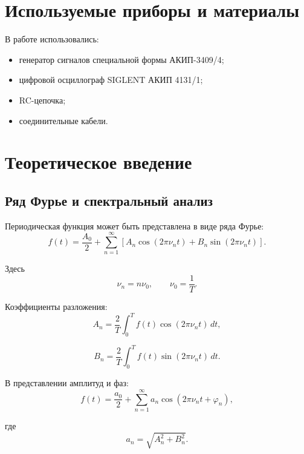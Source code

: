 \documentclass[14pt,a4paper]{extarticle}
\begin{document}
\section*{Используемые приборы и материалы}

В работе использовались:
\begin{itemize}
    \item генератор сигналов специальной формы АКИП-3409/4;
    \item цифровой осциллограф SIGLENT АКИП 4131/1;
    \item RC-цепочка;
    \item соединительные кабели.
\end{itemize}


\section{Теоретическое введение}

\subsection{Ряд Фурье и спектральный анализ}

Периодическая функция может быть представлена в виде ряда Фурье:
\begin{equation}
f(t)=\frac{A_0}{2}
+\sum_{n=1}^{\infty}
\left[
A_n\cos(2\pi\nu_n t)
+
B_n\sin(2\pi\nu_n t)
\right].
\end{equation}

Здесь
\[
\nu_n=n\nu_0,\qquad
\nu_0=\frac{1}{T}.
\]

Коэффициенты разложения:
\begin{equation}
A_n=\frac{2}{T}\int_0^T
f(t)\cos(2\pi\nu_n t)\,dt,
\end{equation}

\begin{equation}
B_n=\frac{2}{T}\int_0^T
f(t)\sin(2\pi\nu_n t)\,dt.
\end{equation}

В представлении амплитуд и фаз:
\begin{equation}
f(t)=\frac{a_0}{2}
+\sum_{n=1}^{\infty}
a_n\cos(2\pi\nu_n t+\varphi_n),
\end{equation}

где
\begin{equation}
a_n=\sqrt{A_n^2+B_n^2}.
\end{equation}
\end{document}
